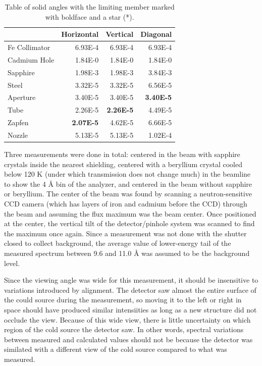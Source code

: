 \documentclass[5p,12pt]{elsarticle}
\begin{document}
\begin{table}
\scriptsize
\begin{center}
     \caption{Table of solid angles with the limiting member marked with boldface and a star (*).  \label{tab:sa} }
\begin{tabular}{|l|r|r|r|}
     \hline
                   &     Horizontal  &     Vertical   &     Diagonal   \\
     \hline
     Fe Collimator &     6.93E-4  &     6.93E-4 &     6.93E-4 \\
     \hline 
     Cadmium Hole  &     1.84E-0  &     1.84E-0 &     1.84E-0 \\
     \hline 
     Sapphire      &     1.98E-3  &     1.98E-3 &     3.84E-3 \\
     \hline 
     Steel         &     3.32E-5  &     3.32E-5 &     6.56E-5 \\
     \hline
     Aperture      &     3.40E-5  &     3.40E-5 &\bf* 3.40E-5 \\
     \hline
     Tube          &     2.26E-5  &\bf* 2.26E-5 &     4.49E-5  \\
     \hline
     Zapfen        &\bf* 2.07E-5  &     4.62E-5 &     6.66E-5 \\
     \hline
     Nozzle        &     5.13E-5  &     5.13E-5 &     1.02E-4 \\
     \hline
\end{tabular}
\end{center}
\end{table}

Three measurements were done in total: centered in the beam with sapphire crystals inside the nearest shielding, centered with a beryllium crystal cooled below 120 K (under which transmission does not change much) in the beamline to show the 4 {\AA} bin of the analyzer, and centered in the beam without sapphire or beryllium.  The center of the beam was found by scanning a neutron-sensitive CCD camera (which has layers of iron and cadmium before the CCD) through the beam and assuming the flux maximum was the beam center.  Once positioned at the center, the vertical tilt of the detector/pinhole system was scanned to find the maximum once again.  Since a measurement was not done with the shutter closed to collect background, the average value of lower-energy tail of the measured spectrum between 9.6 and 11.0 {\AA} was assumed to be the background level.

Since the viewing angle was wide for this measurement, it should be insensitive to variations introduced by alignment.  The detector saw almost the entire surface of the could source during the measurement, so moving it to the left or right in space should have produced similar intensiities as long as a new structure did not occlude the view.  Because of this wide view, there is little uncertainty on which region of the cold source the detector saw.   In other words, spectral variations between measured and calculated values should not be because the detector was similated with a different view of the cold source compared to what was measured.
\end{document}
